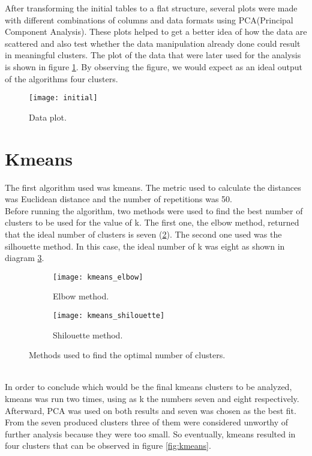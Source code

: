 After transforming the initial tables to a flat structure, several plots were made with different combinations of columns and data formats using PCA(Principal Component Analysis). These plots helped to get a better idea of how the data are scattered and also test whether the data manipulation already done could result in meaningful clusters. The plot of the data that were later used for the analysis is shown in figure \ref{fig:PCA}. By observing the figure, we would expect as an ideal output of the algorithms four clusters.
\begin{figure}[ht]
\centering
\texttt{[image: initial]}
\caption{Data plot.}
\label{fig:PCA}
\end{figure}

\section{Kmeans}
The first algorithm used was kmeans. The metric used to calculate the distances was Euclidean distance and the number of repetitions was 50. \\
Before running the algorithm, two methods were used to find the best number of clusters to be used for the value of k. The first one, the elbow method, returned that the ideal number of clusters is seven (\ref{fig:elbow}). The second one used was the silhouette method. In this case, the ideal number of k was eight as shown in diagram \ref{fig:shilouette}.
\begin{figure}[ht]
\centering
\begin{subfigure}{.5\textwidth}
\centering
\texttt{[image: kmeans\_elbow]}
\caption{Elbow method.}
\label{fig:elbow}
\end{subfigure}%
\begin{subfigure}{.5\textwidth}
\centering
\texttt{[image: kmeans\_shilouette]}
\caption{Shilouette method.}
\label{fig:shilouette}
\end{subfigure}%
\caption{Methods used to find the optimal number of clusters.}
\label{fig:methods}
\end{figure}
\\
In order to conclude which would be the final kmeans clusters to be analyzed, kmeans was run two times, using as k the numbers seven and eight respectively. Afterward, PCA was used on both results and seven was chosen as the best fit. From the seven produced clusters three of them were considered unworthy of further analysis because they were too small. So eventually, kmeans resulted in four clusters that can be observed in figure \ref{fig:kmeans}.
